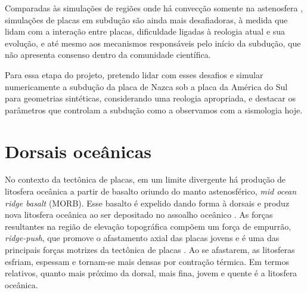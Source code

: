

Comparadas às simulações de regiões onde há convecção somente na astenosfera \citep[modelos do tipo Rayleigh-Taylor,][]{gerya-geodynamic-modelling}, simulações de placas em subdução são ainda mais desafiadoras, à medida que lidam com a interação entre placas, dificuldade ligadas à reologia atual e sua evolução, e até mesmo aos mecanismos responsáveis pelo início da subdução, que não apresenta consenso dentro da comunidade científica. 

Para essa etapa do projeto, pretendo lidar com esses desafios e simular numericamente a subdução da placa de Nazca sob a placa da América do Sul para geometrias sintéticas, considerando uma reologia apropriada, e destacar os parâmetros que controlam a subdução como a observamos com a sismologia hoje.

\section{Dorsais oceânicas}



No contexto da tectônica de placas, em um limite divergente há produção de litosfera oceânica a partir de basalto oriundo do manto astenosférico, \textit{mid ocean ridge basalt} (MORB). Esse basalto é expelido dando forma à dorsais e produz nova litosfera oceânica ao ser depositado no assoalho oceânico \citep{turcotte2002geodynamics}. As forças resultantes na região de elevação topográfica compõem um força de empurrão, \textit{ridge-push}, que promove o afastamento axial das placas jovens e é uma das principais forças motrizes da tectônica de placas \citep{allen2013basin}. Ao se afastarem, as litosferas esfriam, espessam e tornam-se mais densas por contração térmica. Em termos relativos, quanto mais próximo da dorsal, mais fina, jovem e quente é a litosfera oceânica.

